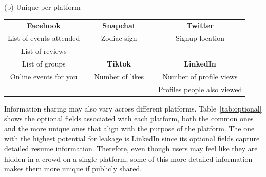 \documentclass[11pt]{article} %
\begin{document}
\begin{table}[tb]
    \vspace{1em}
        \centering
    \vspace{1em}
       (b) Unique per platform\\
    \vspace{1em}
        \begin{tabular}{ccccc} 
\textbf{Facebook}                &  & \textbf{Snapchat}        &  & \textbf{Twitter}                     \\ \cline{1-1} \cline{3-3} \cline{5-5} 
List of events attended &  & Zodiac sign     &  & Signup location             \\
List of reviews         &  &                 &  &                             \\
List of groups          &  & \textbf{Tiktok}          &  & \textbf{LinkedIn}                    \\ \cline{3-3} \cline{5-5} 
Online events for you   &  & Number of likes &  & Number of profile views     \\
                        &  &                 &  & Profiles people also viewed     
        \end{tabular} 
\end{table}

Information sharing may also vary across different platforms. Table~\ref{tab:optional} shows the optional fields associated with each platform, both the common ones and the more unique ones that align with the purpose of the platform. 
The one with the highest potential for leakage is LinkedIn since its optional fields capture detailed resume information. Therefore, even though users may feel like they are hidden in a crowd on a single platform, some of this more detailed information makes them more unique if publicly shared. 
\end{document}
